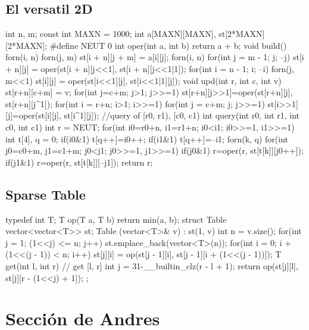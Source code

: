 \documentclass[10pt, landscape, twocolumn, a4paper, notitlepage]{article}
\begin{document}
\subsection{El versatil 2D}
\begin{code}
int n, m; 
const int MAXN = 1000;
int a[MAXN][MAXN], st[2*MAXN][2*MAXN];
#define NEUT 0
int oper(int a, int b) {return a + b;}
void build() {
    forn(i, n) forn(j, m) st[i + n][j + m] = a[i][j];
    forn(i, n) for(int j = m - 1; j; --j)
        st[i + n][j] = oper(st[i + n][j<<1], st[i + n][j<<1|1]);
    for(int i = n - 1; i; --i) forn(j, m<<1) {
        st[i][j] = oper(st[i<<1][j], st[i<<1|1][j]);
    }
}
void upd(int r, int c, int v){
    st[r+n][c+m] = v;
    for(int j=c+m; j>1; j>>=1) st[r+n][j>>1]=oper(st[r+n][j], st[r+n][j^1]);
    for(int i = r+n; i>1; i>>=1) for(int j = c+m; j; j>>=1)
        st[i>>1][j]=oper(st[i][j], st[i^1][j]);
}
//query of [r0, r1), [c0, c1)
int query(int r0, int r1, int c0, int c1) {
    int r = NEUT;
    for(int i0=r0+n, i1=r1+n; i0<i1; i0>>=1, i1>>=1) {
        int t[4], q = 0;
        if(i0&1) t[q++]=i0++;
        if(i1&1) t[q++]=--i1;
        forn(k, q) for(int j0=c0+m, j1=c1+m; j0<j1; j0>>=1, j1>>=1) {
            if(j0&1) r=oper(r, st[t[k]][j0++]);
            if(j1&1) r=oper(r, st[t[k]][--j1]);
        }
    }
    return r;
}
\end{code}
\subsection{Sparse Table}
\begin{code}
typedef int T;
T op(T a, T b) {return min(a, b);}
struct Table{
    vector<vector<T>> st;
    Table (vector<T>& v) : st(1, v) {
        int n = v.size();
        for(int j = 1; (1<<j) <= n; j++) {
            st.emplace_back(vector<T>(n));
            for(int i = 0; i + (1<<(j - 1)) < n; i++) {
                st[j][i] = op(st[j - 1][i], st[j - 1][i + (1<<(j - 1))]);
            }
        }
    }
    T get(int l, int r) { // get [l, r]
        int j = 31-__builtin_clz(r - l + 1);
        return op(st[j][l], st[j][r - (1<<j) + 1]);
    }
};
\end{code}
\section{Secci\'on de Andres}
\end{document}
